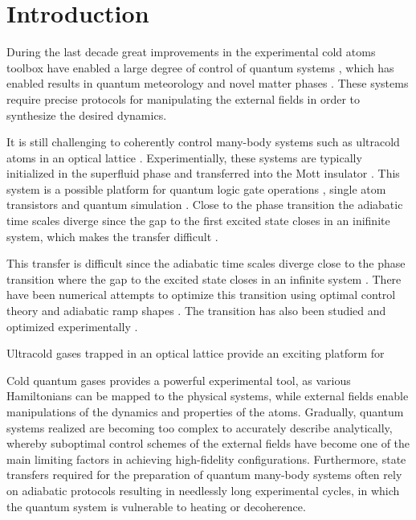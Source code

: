 \section{Introduction}
During the last decade great improvements in the experimental cold atoms toolbox have enabled a large degree of control of quantum systems \cite{bloch2008many,bloch2012quantum}, which has enabled results in quantum meteorology \cite{rosi2014precision} and novel matter phases \cite{leonard2017supersolid}. These systems require precise protocols for manipulating the external fields in order to synthesize the desired dynamics. 

It is still challenging to coherently control many-body systems such as ultracold atoms in an optical lattice \cite{doria2011optimal}. Experimentially, these systems are typically initialized in the superfluid phase and transferred into the Mott insulator \cite{braun2015emergence, BH_experimental_realization}. This system is a possible platform for quantum logic gate operations \cite{two_qubit_quantum_gate_by_cold_controlled_collisons, quantum_gate_BH_via_collisions,laser_induced_quantum_gate_operations,FastQuantumGates,Toffili_gate_1D_lattice}, single atom transistors \cite{single_atom_transistor} and quantum simulation \cite{quantum_simulator}. Close to the phase transition the adiabatic time scales diverge since the gap to the first excited state closes in an inifinite system, which makes the transfer difficult \cite{cucchietti2007dynamics}.

This transfer is difficult since the adiabatic time scales diverge close to the phase transition where the gap to the excited state closes in an infinite system \cite{cucchietti2007dynamics}. There have been numerical attempts to optimize this transition using optimal control theory and adiabatic ramp shapes \cite{ramping_optimization_zakrzewski,doria2011optimal,van2016optimal}. The transition has also been studied and optimized experimentally \cite{rosi2013fast,braun2015emergence,van2016optimal}.

Ultracold gases trapped in an optical lattice provide an exciting platform for 



 Cold quantum gases provides a powerful experimental tool, as various Hamiltonians can be mapped to the physical systems, while external fields enable manipulations of the dynamics and properties of the atoms. Gradually, quantum systems realized are becoming too complex to accurately describe analytically, whereby suboptimal control schemes of the external fields have become one of the main limiting factors in achieving high-fidelity configurations. Furthermore, state transfers required for the preparation of quantum many-body systems often rely on adiabatic protocols resulting in needlessly long experimental cycles, in which the quantum system is vulnerable to heating or decoherence.

